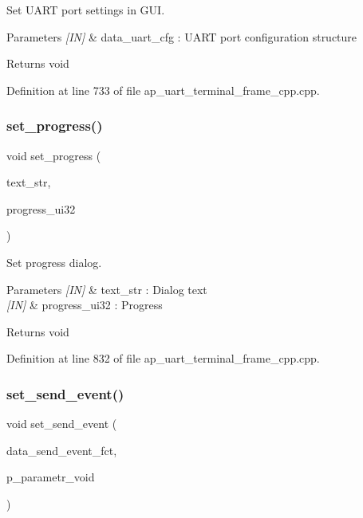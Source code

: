 Set U\+A\+RT port settings in G\+UI. 


\begin{DoxyParams}{Parameters}
{\em \mbox{[}\+I\+N\mbox{]}} & data\+\_\+uart\+\_\+cfg \+: U\+A\+RT port configuration structure \\
\hline
\end{DoxyParams}
\begin{DoxyReturn}{Returns}
void 
\end{DoxyReturn}


Definition at line 733 of file ap\+\_\+uart\+\_\+terminal\+\_\+frame\+\_\+cpp.\+cpp.

\mbox{\label{group___u_a_r_t__terminal_gaffd459f0ab93e19fd565f8194b5ef3a9}} 
\subsubsection{set\_progress()}
{\footnotesize\ttfamily void set\+\_\+progress (\begin{DoxyParamCaption}\item[{wx\+String}]{text\+\_\+str,  }\item[{uint32\+\_\+t}]{progress\+\_\+ui32 }\end{DoxyParamCaption})}



Set progress dialog. 


\begin{DoxyParams}{Parameters}
{\em \mbox{[}\+I\+N\mbox{]}} & text\+\_\+str \+: Dialog text \\
\hline
{\em \mbox{[}\+I\+N\mbox{]}} & progress\+\_\+ui32 \+: Progress \\
\hline
\end{DoxyParams}
\begin{DoxyReturn}{Returns}
void 
\end{DoxyReturn}


Definition at line 832 of file ap\+\_\+uart\+\_\+terminal\+\_\+frame\+\_\+cpp.\+cpp.

\mbox{\label{group___u_a_r_t__terminal_ga40fe93386e57619826bc2f50a27dbc0c}} 
\subsubsection{set\_send\_event()}
{\footnotesize\ttfamily void set\+\_\+send\+\_\+event (\begin{DoxyParamCaption}\item[{\textbf{ send\+\_\+event\+\_\+fct}}]{data\+\_\+send\+\_\+event\+\_\+fct,  }\item[{void $\ast$}]{p\+\_\+parametr\+\_\+void }\end{DoxyParamCaption})}



